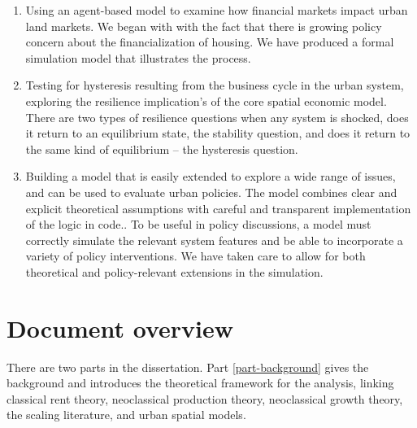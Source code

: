 \begin{enumerate}
    \item Using an agent-based model to examine how financial markets impact urban \glspl{land market}.
We began with with the fact that there is growing policy concern about the financialization of  housing. We have produced a formal simulation model that illustrates the process. 

    \item Testing for \gls{hysteresis} resulting from the business cycle in the urban system, exploring the \gls{resilience} implication's of the core spatial economic model.
There are two types of resilience questions when any system is shocked, does it return to an 
equilibrium state, the stability question, and does it return to the same kind of equilibrium -- the hysteresis question. %

    \item Building a model that is easily extended to explore a wide range of issues, and can be used  to evaluate urban policies. 
The model combines clear and explicit theoretical assumptions with careful and transparent implementation of the logic in code.. %
To be useful in policy discussions, a model must correctly simulate the relevant system features and be able to incorporate a variety of policy interventions. We have taken care to allow for  both theoretical and policy-relevant extensions in the simulation.%
\end{enumerate}

\section{Document overview}

There are two parts in the dissertation. 
Part \ref{part-background} gives the background and introduces the theoretical framework for the analysis,  linking classical rent theory, neoclassical production theory, neoclassical growth theory, the scaling literature, and urban spatial models. 

